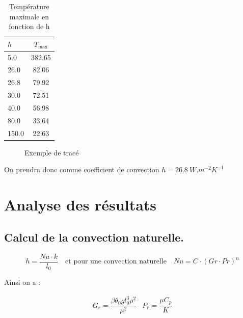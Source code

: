 \documentclass[11pt,a4paper]{article}
\begin{document}
\begin{table}[H]
\centering
\begin{tabular}{|l|c|}
\hline
\rowcolor{blue!17}
$h$ & $T_\text{max}$ \\
\hline
\rowcolor{pink!20}
5.0 & 382.65 \\
\hline
\rowcolor{pink!40}
26.0 & 82.06 \\
\hline
\rowcolor{pink!20}
26.8 & 79.92 \\
\hline
\rowcolor{pink!40}
30.0 & 72.51 \\
\hline
\rowcolor{pink!20}
40.0 & 56.98 \\
\hline
\rowcolor{pink!40}
80.0 & 33.64 \\
\hline
\rowcolor{pink!20}
150.0 & 22.63 \\
\hline
\end{tabular}
\caption{Température maximale en fonction de h}
\label{tab:h_empirique}
\end{table}


\begin{figure}[H]
\centering
{}
\caption{Exemple de tracé}
\end{figure}

On prendra donc comme coefficient de convection $h = \SI{26.8}{W.m^{-2}K^{-1}}$


\section{Analyse des résultats}
\subsection{Calcul de la convection naturelle.}


\[
h = \frac{Nu \cdot k}{l_0} \quad \text{et pour une convection naturelle} \quad Nu = C \cdot (Gr \cdot Pr)^n
\]



Ainsi on a :

\[
\begin{array}{cc}
G_r = \dfrac{\beta \theta_0 g l_0^3 \rho^2}{\mu^2} & P_r = \dfrac{\mu C_p}{K}
\end{array}
\]
\end{document}
